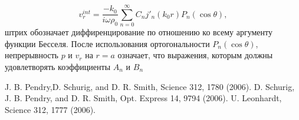 \documentclass[a4paper, 12pt]{article}
\begin{document}
 \begin{equation}
 	 	v_r^{int} = \frac{-k_0}{i\omega\rho_0}
 		\sum_{n=0}^\infty{C_nj'_n(k_0r)P_n(\cos\theta)},
 \end{equation}
 штрих обозначает диффиренцирование по отношению ко всему аргументу функции 
 Бесселя. После использования ортогональности $P_n(\cos\theta)$, непрерывность
 $p$ и $v_r$ на $r=a$ означает, что выражения, которым должны удовлетворять
 коэффициенты $A_n$ и $B_n$

\begin{thebibliography}{99}
J. B. Pendry,D. Schurig, and D. R. Smith, Science 312, 1780 (2006).
D. Schurig, J. B. Pendry, and D. R. Smith, Opt. Express 14,
9794 (2006).
U. Leonhardt, Science 312, 1777 (2006).

\end{thebibliography}
\end{document}
